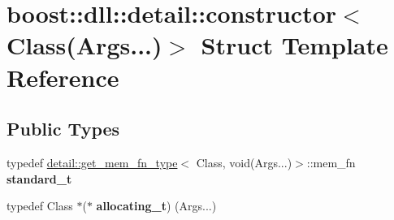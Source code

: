\hypertarget{a00064}{}\section{boost\+:\+:dll\+:\+:detail\+:\+:constructor$<$ Class(Args...)$>$ Struct Template Reference}
\label{a00064}
\subsection*{Public Types}
\begin{DoxyCompactItemize}
\item 
typedef \hyperlink{a00131}{detail\+::get\+\_\+mem\+\_\+fn\+\_\+type}$<$ Class, void(Args...)$>$\+::mem\+\_\+fn {\bfseries standard\+\_\+t}\hypertarget{a00064_ab765d8c7c083efce92a933c806a41e81}{}\label{a00064_ab765d8c7c083efce92a933c806a41e81}

\item 
typedef Class $\ast$($\ast$ {\bfseries allocating\+\_\+t}) (Args...)\hypertarget{a00064_a19159ea77e5c102bd216195b32045677}{}\label{a00064_a19159ea77e5c102bd216195b32045677}

\end{DoxyCompactItemize}
